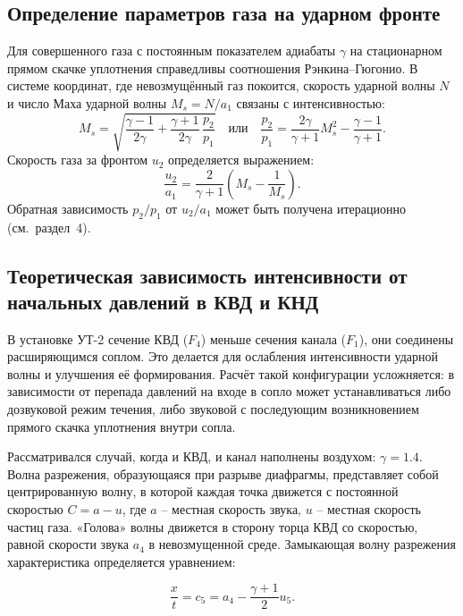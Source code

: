 \documentclass[12pt,a4paper]{article}
\begin{document}
\subsection{Определение параметров газа на ударном фронте}
Для совершенного газа с постоянным показателем адиабаты $\gamma$ на стационарном прямом скачке уплотнения справедливы соотношения Рэнкина–Гюгонио. В системе координат, где невозмущённый газ покоится, скорость ударной волны $N$ и число Маха ударной волны $M_s = N/a_1$ связаны с интенсивностью:
\begin{equation}
    M_s = \sqrt{ \frac{\gamma-1}{2\gamma} + \frac{\gamma+1}{2\gamma}\,\frac{p_2}{p_1} } \quad \text{или} \quad
    \frac{p_2}{p_1} = \frac{2\gamma}{\gamma+1} M_s^2 - \frac{\gamma-1}{\gamma+1}.
    \label{eq:Ms}
\end{equation}
Скорость газа за фронтом $u_2$ определяется выражением:
\begin{equation}
    \frac{u_2}{a_1} = \frac{2}{\gamma+1}\left(M_s - \frac{1}{M_s}\right).
    \label{eq:u2a1}
\end{equation}
Обратная зависимость $p_2/p_1$ от $u_2/a_1$ может быть получена итерационно (см.~раздел~4).

\subsection{Теоретическая зависимость интенсивности от начальных давлений в КВД и КНД}
В установке УТ-2 сечение КВД ($F_4$) меньше сечения канала ($F_1$), они соединены расширяющимся соплом. Это делается для ослабления интенсивности ударной волны и улучшения её формирования. Расчёт такой конфигурации усложняется: в зависимости от перепада давлений на входе в сопло может устанавливаться либо дозвуковой режим течения, либо звуковой с последующим возникновением прямого скачка уплотнения внутри сопла.

Рассматривался случай, когда и КВД, и канал наполнены воздухом: \(\gamma = 1.4\). Волна разрежения, образующаяся при разрыве диафрагмы, представляет собой центрированную волну, в которой каждая точка движется с постоянной скоростью \(C = a - u\), где \(a\) – местная скорость звука, \(u\) – местная скорость частиц газа. «Голова» волны движется в сторону торца КВД со скоростью, равной скорости звука \(a_4\) в невозмущенной среде. Замыкающая волну разрежения характеристика определяется уравнением:

\begin{equation}\label{eq:87}
\frac{x}{t} = c_5 = a_4 - \frac{\gamma + 1}{2} u_5.
\end{equation}
\end{document}
